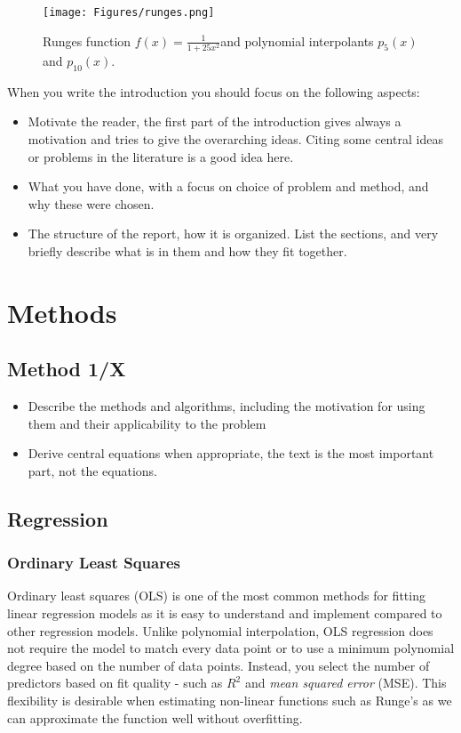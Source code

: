 \documentclass[amssymb,twocolumn,aps]{revtex4}
\begin{document}
\begin{figure}[h]
    \centering
    \texttt{[image: Figures/runges.png]}
    \caption{Runges function $f(x) = \frac{1}{1+25x^2} $and polynomial interpolants $p_5(x)$ and $p_{10}(x)$.}
    \label{fig:rungesfunction}
\end{figure}

When you write the introduction you should focus on the following aspects:
\begin{itemize}
    \item Motivate the reader, the first part of the introduction gives always a motivation and tries to give the overarching ideas. Citing some central ideas or problems in the literature is a good idea here. \cite{compfys}\cite{eigenvalue}\cite{hein, hastie}
    \item What you have done, with a focus on choice of problem and method, and why these were chosen.
    \item The structure of the report, how it is organized. List the sections, and very briefly describe what is in them and how they fit together.
\end{itemize}


    
\section{Methods}\label{section:methods}

\subsection{Method 1/X}

\begin{itemize}
    \item Describe the methods and algorithms, including the motivation for using them and their applicability to the problem
    \item Derive central equations when appropriate, the text is the most important part, not the equations.
\end{itemize}

\subsection{Regression}

\subsubsection{Ordinary Least Squares}
Ordinary least squares (OLS) is one of the most common methods for fitting linear regression models as it is easy to understand and implement compared to other regression models. Unlike polynomial interpolation, OLS regression does not require the model to match every data point or to use a minimum polynomial degree based on the number of data points. Instead, you select the number of predictors based on fit quality - such as $R^2$ and \textit{mean squared error} (MSE). This flexibility is desirable when estimating non-linear functions such as Runge's as we can approximate the function well without overfitting. 
\end{document}
